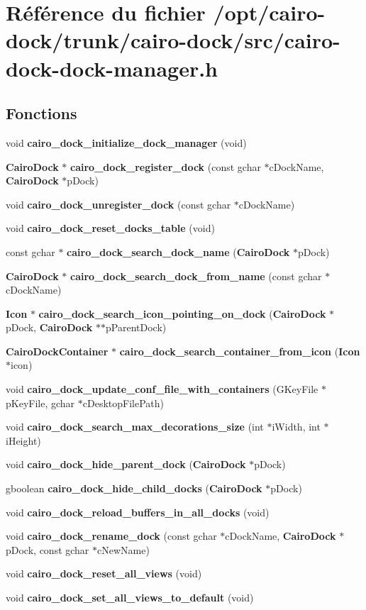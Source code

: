 \section{Référence du fichier /opt/cairo-dock/trunk/cairo-dock/src/cairo-dock-dock-manager.h}
\label{cairo-dock-dock-manager_8h}
\subsection*{Fonctions}
\begin{CompactItemize}
\item 
void {\bf cairo\_\-dock\_\-initialize\_\-dock\_\-manager} (void)
\item 
{\bf CairoDock} $\ast$ {\bf cairo\_\-dock\_\-register\_\-dock} (const gchar $\ast$cDockName, {\bf CairoDock} $\ast$pDock)
\item 
void {\bf cairo\_\-dock\_\-unregister\_\-dock} (const gchar $\ast$cDockName)
\item 
void {\bf cairo\_\-dock\_\-reset\_\-docks\_\-table} (void)
\item 
const gchar $\ast$ {\bf cairo\_\-dock\_\-search\_\-dock\_\-name} ({\bf CairoDock} $\ast$pDock)
\item 
{\bf CairoDock} $\ast$ {\bf cairo\_\-dock\_\-search\_\-dock\_\-from\_\-name} (const gchar $\ast$cDockName)
\item 
{\bf Icon} $\ast$ {\bf cairo\_\-dock\_\-search\_\-icon\_\-pointing\_\-on\_\-dock} ({\bf CairoDock} $\ast$pDock, {\bf CairoDock} $\ast$$\ast$pParentDock)
\item 
{\bf CairoDockContainer} $\ast$ {\bf cairo\_\-dock\_\-search\_\-container\_\-from\_\-icon} ({\bf Icon} $\ast$icon)
\item 
void {\bf cairo\_\-dock\_\-update\_\-conf\_\-file\_\-with\_\-containers} (GKeyFile $\ast$pKeyFile, gchar $\ast$cDesktopFilePath)
\item 
void {\bf cairo\_\-dock\_\-search\_\-max\_\-decorations\_\-size} (int $\ast$iWidth, int $\ast$iHeight)
\item 
void {\bf cairo\_\-dock\_\-hide\_\-parent\_\-dock} ({\bf CairoDock} $\ast$pDock)
\item 
gboolean {\bf cairo\_\-dock\_\-hide\_\-child\_\-docks} ({\bf CairoDock} $\ast$pDock)
\item 
void {\bf cairo\_\-dock\_\-reload\_\-buffers\_\-in\_\-all\_\-docks} (void)
\item 
void {\bf cairo\_\-dock\_\-rename\_\-dock} (const gchar $\ast$cDockName, {\bf CairoDock} $\ast$pDock, const gchar $\ast$cNewName)
\item 
void {\bf cairo\_\-dock\_\-reset\_\-all\_\-views} (void)
\item 
void {\bf cairo\_\-dock\_\-set\_\-all\_\-views\_\-to\_\-default} (void)
\end{CompactItemize}


